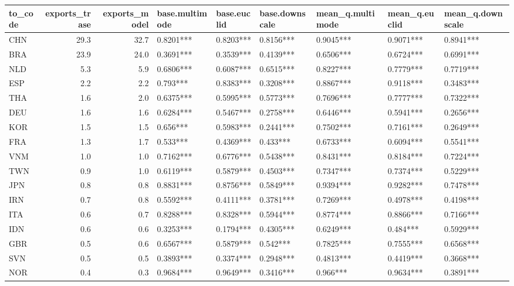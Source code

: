 \begin{table}[ht]
\centering
\begin{tabular}{lrrllllll}
  \hline
to\_code & exports\_trase & exports\_model & base.multimode & base.euclid & base.downscale & mean\_q.multimode & mean\_q.euclid & mean\_q.downscale \\ 
  \hline
CHN & 29.3 & 32.7 & 0.8201*** & 0.8203*** & 0.8156*** & 0.9045*** & 0.9071*** & 0.8941*** \\ 
  BRA & 23.9 & 24.0 & 0.3691*** & 0.3539*** & 0.4139*** & 0.6506*** & 0.6724*** & 0.6991*** \\ 
  NLD & 5.3 & 5.9 & 0.6806*** & 0.6087*** & 0.6515*** & 0.8227*** & 0.7779*** & 0.7719*** \\ 
  ESP & 2.2 & 2.2 & 0.793*** & 0.8383*** & 0.3208*** & 0.8867*** & 0.9118*** & 0.3483*** \\ 
  THA & 1.6 & 2.0 & 0.6375*** & 0.5995*** & 0.5773*** & 0.7696*** & 0.7777*** & 0.7322*** \\ 
  DEU & 1.6 & 1.6 & 0.6284*** & 0.5467*** & 0.2758*** & 0.6446*** & 0.5941*** & 0.2656*** \\ 
  KOR & 1.5 & 1.5 & 0.656*** & 0.5983*** & 0.2441*** & 0.7502*** & 0.7161*** & 0.2649*** \\ 
  FRA & 1.3 & 1.7 & 0.533*** & 0.4369*** & 0.433*** & 0.6733*** & 0.6094*** & 0.5541*** \\ 
  VNM & 1.0 & 1.0 & 0.7162*** & 0.6776*** & 0.5438*** & 0.8431*** & 0.8184*** & 0.7224*** \\ 
  TWN & 0.9 & 1.0 & 0.6119*** & 0.5879*** & 0.4503*** & 0.7347*** & 0.7374*** & 0.5229*** \\ 
  JPN & 0.8 & 0.8 & 0.8831*** & 0.8756*** & 0.5849*** & 0.9394*** & 0.9282*** & 0.7478*** \\ 
  IRN & 0.7 & 0.8 & 0.5592*** & 0.4111*** & 0.3781*** & 0.7269*** & 0.4978*** & 0.4198*** \\ 
  ITA & 0.6 & 0.7 & 0.8288*** & 0.8328*** & 0.5944*** & 0.8774*** & 0.8866*** & 0.7166*** \\ 
  IDN & 0.6 & 0.6 & 0.3253*** & 0.1794*** & 0.4305*** & 0.6249*** & 0.484*** & 0.5929*** \\ 
  GBR & 0.5 & 0.6 & 0.6567*** & 0.5879*** & 0.542*** & 0.7825*** & 0.7555*** & 0.6568*** \\ 
  SVN & 0.5 & 0.5 & 0.3893*** & 0.3374*** & 0.2948*** & 0.4813*** & 0.4419*** & 0.3668*** \\ 
  NOR & 0.4 & 0.3 & 0.9684*** & 0.9649*** & 0.3416*** & 0.966*** & 0.9634*** & 0.3891*** \\ 

\end{tabular}
\end{table}
